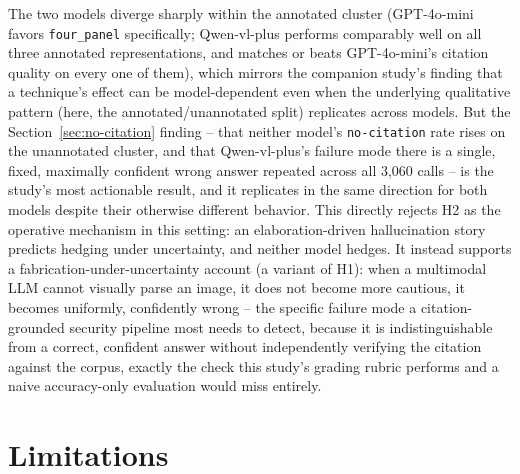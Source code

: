 \documentclass[11pt]{article}
\begin{document}
The two models diverge sharply within the annotated cluster (GPT-4o-mini favors \texttt{four\_panel}
specifically; Qwen-vl-plus performs comparably well on all three annotated representations, and
matches or beats GPT-4o-mini's citation quality on every one of them), which mirrors the companion
study's finding that a technique's effect can be model-dependent even when the underlying
qualitative pattern (here, the annotated/unannotated split) replicates across models. But the
Section~\ref{sec:no-citation} finding -- that neither model's \texttt{no-citation} rate rises on the
unannotated cluster, and that Qwen-vl-plus's failure mode there is a single, fixed, maximally
confident wrong answer repeated across all 3,060 calls -- is the study's most actionable result, and
it replicates in the same direction for both models despite their otherwise different behavior. This
directly rejects H2 as the operative mechanism in this setting: an elaboration-driven hallucination
story predicts hedging under uncertainty, and neither model hedges. It instead supports a
fabrication-under-uncertainty account (a variant of H1): when a multimodal LLM cannot visually parse
an image, it does not become more cautious, it becomes uniformly, confidently wrong -- the specific
failure mode a citation-grounded security pipeline most needs to detect, because it is
indistinguishable from a correct, confident answer without independently verifying the citation
against the corpus, exactly the check this study's grading rubric performs and a naive
accuracy-only evaluation would miss entirely.

\section{Limitations}
\label{sec:limitations}
\end{document}
